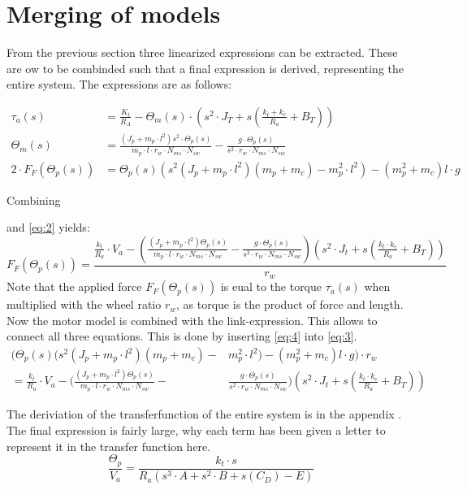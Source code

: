 \section{Merging of models}
From the previous section three linearized expressions can be extracted. These are ow to be combinded such that a final expression is derived, representing the entire system.
The expressions are as follows:

\begin{align}
\tau_a(s)&=\frac{K_t}{R_A}- \Theta_m(s)\cdot(s^2\cdot J_T+s(\frac{k_t+k_e}{R_a}+B_T))\label{eq:1}\\
\Theta_m(s)&= \frac{(J_p+m_p\cdot l^2)s^2\cdot \Theta_p(s)}{m_p\cdot l \cdot r_w \cdot N_{ms}\cdot N_{sw}}-\frac{g\cdot \Theta_p(s)}{s^2 \cdot r_w\cdot N_{ms}\cdot N_{sw}} \label{eq:2}\\
2\cdot F_F(\Theta_p(s))&=\Theta_p(s)(s^2(J_p+m_p\cdot l^2)(m_p+m_c)-m_p^2\cdot l^2)-(m_p^2 + m_c)l\cdot g \label{eq:3}
\end{align}

Combining \author{eq:1} and \autoref{eq:2} yields:
\begin{equation}
F_F(\Theta_p(s))=\frac{\frac{k_t}{R_a}\cdot V_a-(\frac{(J_p+m_p\cdot l^2)\Theta_p(s)}{m_p\cdot l\cdot r_w \cdot N_{ms}\cdot N_{sw}}-\frac{g\cdot \Theta_p(s)}{s^2\cdot r_w \cdot N_{ms}\cdot N_{sw}})(s^2\cdot J_t+s(\frac{k_t\cdot k_e}{R_a}+B_T))}{r_w} \label{eq:4}
\end{equation}
Note that the applied force $F_F(\Theta_p(s))$ is eual to the torque $\tau_a(s)$ when multiplied with the wheel ratio $r_w$, as torque is the product of force and length. \newpar
Now the motor model is combined  with the link-expression. This allows to connect all three equations. This is done by inserting \autoref{eq:4} into \autoref{eq:3}.
\begin{align}
(\Theta_p(s)(s^2(J_p+m_p\cdot l^2)(m_p+m_c)-&m_p^2\cdot l^2)-(m_p^2 + m_c)l\cdot g )\cdot r_w  \\ \nonumber
=\frac{k_t}{R_a}\cdot V_a-(\frac{(J_p+m_p\cdot l^2)\Theta_p(s)}{m_p\cdot l\cdot r_w \cdot N_{ms}\cdot N_{sw}}-&\frac{g\cdot \Theta_p(s)}{s^2\cdot r_w \cdot N_{ms}\cdot N_{sw}})(s^2\cdot J_t+s(\frac{k_t\cdot k_e}{R_a}+B_T))
\end{align}

The deriviation of the transferfunction of the entire system is in the appendix . The final expression is fairly large, why each term has been given a letter to represent it in the transfer function here.
\begin{equation}
\frac{\Theta_p}{V_a}=\frac{k_t\cdot s}{R_a(s^3\cdot A + s^2 \cdot B + s(C_D)-E)}
\end{equation}






